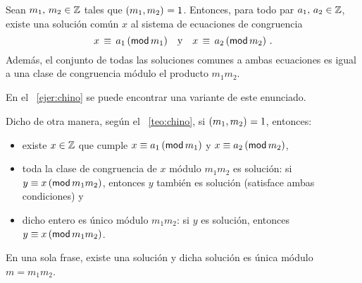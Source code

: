 \begin{teoChino}
	\label{teo:chino}
	Sean $m_1,\,m_2\in\Enteros$ tales que $\mcd{m_1,m_2}=1$.
	Entonces, para todo par $a_1,\,a_2\in\Enteros$, existe una
	soluci\'on com\'un $x$ al sistema de ecuaciones de congruencia
	\begin{displaymath}
			x \,\equiv\,a_1\tmodulo[m_1] \dispand
			x \,\equiv\,a_2\tmodulo[m_2] \dispstop
	\end{displaymath}
	Adem\'as, el conjunto de todas las soluciones comunes a ambas
	ecuaciones es igual a una clase de congruencia m\'odulo el
	producto $m_1m_2$.
\end{teoChino}

En el \ejername~\ref{ejer:chino} se puede encontrar una variante de
este enunciado.

\begin{obsChino}\label{obs:chino}
	Dicho de otra manera, seg\'un el \teoname~\ref{teo:chino},
	si $\mcd{m_1,m_2}=1$, entonces:
	\begin{itemize}
		\item existe $x\in\Enteros$ que cumple
			$x\equiv a_1\tmodulo[m_1]$ y
			$x\equiv a_2\tmodulo[m_2]$,
		\item toda la clase de congruencia de $x$ m\'odulo
			$m_1m_2$ es soluci\'on:
			si $y\equiv x\tmodulo[m_1m_2]$, entonces
			$y$ tambi\'en es soluci\'on (satisface ambas
			condiciones) y
		\item dicho entero es \'unico m\'odulo $m_1m_2$:
			si $y$ es soluci\'on, entonces
			$y\equiv x\tmodulo[m_1m_2]$.
	\end{itemize}
	En una sola frase, existe una soluci\'on y dicha
	soluci\'on es \'unica m\'odulo $m=m_1m_2$.
\end{obsChino}

